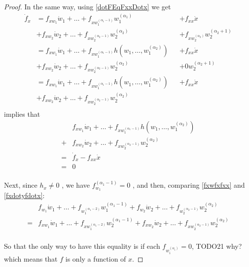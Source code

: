 \documentclass[12pt]{article}
\begin{document}
\begin{proof}
In the same way, using \eqref{dotFEqFxxDotx} we get
\begin{equation}\begin{alignedat}{3}
  \dot{f}_x
  &= f_{xw_1} \dot{w}_1 + \ldots + f_{xw_1^{(\alpha_1 - 1 )}}w_1^{(\alpha_1)} &&+ f_{xx}\dot{x} \\
  &+ f_{xw_2} \dot{w}_2 + \ldots + f_{xw_2^{(\alpha_2 - 1 )}}w_2^{(\alpha_2)} &&+ f_{xw_2^{(\alpha_2)}}w_2^{(\alpha_2 + 1)} \\
  &= f_{xw_1} \dot{w}_1 + \ldots + f_{xw_1^{(\alpha_1 - 1 )}} h(w_1, \ldots, w_1^{(\alpha_2)}) &&+ f_{xx}\dot{x} \\
  &+ f_{xw_2} \dot{w}_2 + \ldots + f_{xw_2^{(\alpha_2 - 1 )}}w_2^{(\alpha_2)} &&+ 0w_2^{(\alpha_2 + 1)} \\
  &= f_{xw_1} \dot{w}_1 + \ldots + f_{xw_1^{(\alpha_1 - 1 )}} h(w_1, \ldots, w_1^{(\alpha_2)}) &&+ f_{xx}\dot{x} \\
  &+ f_{xw_2} \dot{w}_2 + \ldots + f_{xw_2^{(\alpha_2 - 1 )}}w_2^{(\alpha_2)} && \\
\end{alignedat}\end{equation}
implies that 
\begin{equation}\begin{aligned} \label{fxwfxfxx}
  &f_{xw_1} \dot{w}_1 + \ldots + f_{xw_1^{(\alpha_1 - 1 )}} h(w_1, \ldots, w_1^{(\alpha_2)}) \\
  + &f_{xw_2} \dot{w}_2 + \ldots + f_{xw_2^{(\alpha_2 - 1 )}}w_2^{(\alpha_2)} \\
  = &\dot{f}_x - f_{xx}\dot{x} \\ 
  = &0 \\  
\end{aligned}\end{equation}

Next, since $h_x \neq 0$ \label{TODO15}, we have $f_{w_1}^{(\alpha_1 - 1)} = 0$ \label{TODO20}, 
and then, comparing \eqref{fxwfxfxx} and \eqref{fxdotyfdotx}:
\begin{equation}\begin{aligned} \label{fxwfxfxx}
  &f_{w_1} \dot{w}_1 + \ldots + f_{w_1^{(\alpha_1 - 2 )}} w_1^{(\alpha_1-1)}
  + f_{w_2} \dot{w}_2 + \ldots + f_{w_2^{(\alpha_2 - 1 )}}w_2^{(\alpha_2)} \\
  = &f_{xw_1} \dot{w}_1 + \ldots + f_{xw_1^{(\alpha_1 - 2 )}} w_2^{(\alpha_1-1)}
  + f_{xw_2} \dot{w}_2 + \ldots + f_{xw_2^{(\alpha_2 - 1 )}}w_2^{(\alpha_2)} \\
\end{aligned}\end{equation}

So that the only way to have this equality is if each $f_{w_i^{(\alpha_i)}} = 0$, TODO21 why? which means that $f$ is only a function of $x$.

\end{proof}
\end{document}
